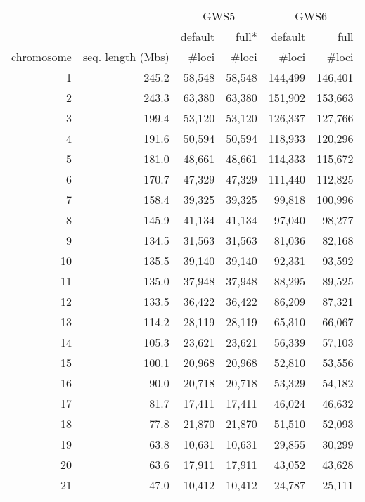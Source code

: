 \documentclass[10pt,a4paper]{article}
\newcommand{\GWSFive}{GWS5\xspace}
\newcommand{\GWSSix}{GWS6\xspace}
\begin{document}
\begin{table}[htp]
\begin{center}
\begin{tabular}{|r|r||rr||rr|}
\hline
     & & \multicolumn{2}{c||}{\GWSFive} & \multicolumn{2}{c|}{\GWSSix} \\
     & & default & full* & default & full \\
chromosome & seq. length (Mbs) & \#loci & \#loci & \#loci & \#loci \\
\hline
\hline
1  & 245.2   & 58,548  &  58,548  &  144,499  &  146,401  \\
2  & 243.3   & 63,380  &  63,380  &  151,902  &  153,663  \\
3  & 199.4   & 53,120  &  53,120  &  126,337  &  127,766  \\
4  & 191.6   & 50,594  &  50,594  &  118,933  &  120,296  \\
5  & 181.0   & 48,661  &  48,661  &  114,333  &  115,672  \\
6  & 170.7   & 47,329  &  47,329  &  111,440  &  112,825  \\
7  & 158.4   & 39,325  &  39,325  &   99,818  &  100,996  \\
8  & 145.9   & 41,134  &  41,134  &   97,040  &   98,277  \\
9  & 134.5   & 31,563  &  31,563  &   81,036  &   82,168  \\
10 & 135.5   & 39,140  &  39,140  &   92,331  &   93,592  \\
\hline
11 & 135.0   & 37,948  &  37,948  &   88,295  &   89,525  \\
12 & 133.5   & 36,422  &  36,422  &   86,209  &   87,321  \\
13 & 114.2   & 28,119  &  28,119  &   65,310  &   66,067  \\
14 & 105.3   & 23,621  &  23,621  &   56,339  &   57,103  \\
15 & 100.1   & 20,968  &  20,968  &   52,810  &   53,556  \\
16 &  90.0   & 20,718  &  20,718  &   53,329  &   54,182  \\
17 &  81.7   & 17,411  &  17,411  &   46,024  &   46,632  \\
18 &  77.8   & 21,870  &  21,870  &   51,510  &   52,093  \\
19 &  63.8   & 10,631  &  10,631  &   29,855  &   30,299  \\
20 &  63.6   & 17,911  &  17,911  &   43,052  &   43,628  \\
\hline
21 &  47.0   & 10,412  &  10,412  &   24,787  &   25,111  \\

\end{tabular}
\end{center}
\end{table}
\end{document}
